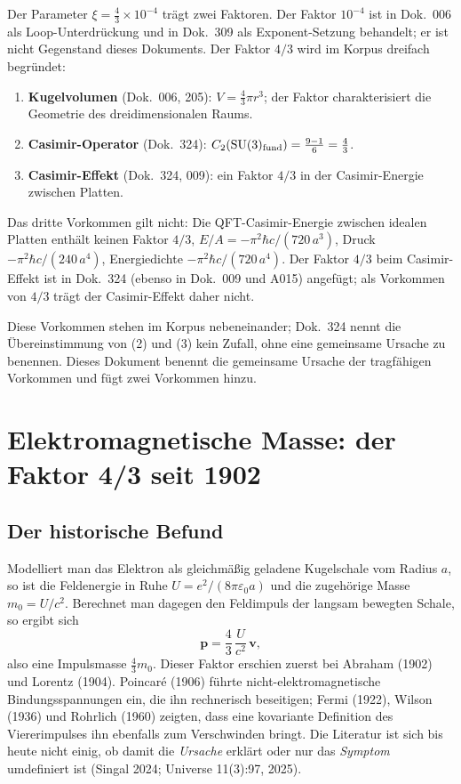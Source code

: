 Der Parameter $\xi = \tfrac{4}{3}\times10^{-4}$ trägt zwei Faktoren. Der
Faktor $10^{-4}$ ist in Dok.~006 als Loop-Unterdrückung und in Dok.~309 als
Exponent-Setzung behandelt; er ist nicht Gegenstand dieses Dokuments. Der
Faktor $4/3$ wird im Korpus dreifach begründet:

\begin{enumerate}
\item \textbf{Kugelvolumen} (Dok.~006, 205): $V = \tfrac{4}{3}\pi r^3$; der
  Faktor charakterisiert die Geometrie des dreidimensionalen Raums.
\item \textbf{Casimir-Operator} (Dok.~324): $C_2(\mathrm{SU}(3)_{\rm fund})
  = \tfrac{9-1}{6} = \tfrac{4}{3}$.
\item \textbf{Casimir-Effekt} (Dok.~324, 009): ein Faktor $4/3$ in
  der Casimir-Energie zwischen Platten.
\end{enumerate}
Das dritte Vorkommen gilt nicht: Die QFT-Casimir-Energie zwischen idealen
Platten enthält keinen Faktor $4/3$, $E/A = -\pi^2\hbar c/(720\,a^3)$, Druck
$-\pi^2\hbar c/(240\,a^4)$, Energiedichte $-\pi^2\hbar c/(720\,a^4)$. Der
Faktor $4/3$ beim Casimir-Effekt ist in Dok.~324 (ebenso in Dok.~009 und A015)
angefügt; als Vorkommen von $4/3$ trägt der Casimir-Effekt daher nicht.

Diese Vorkommen stehen im Korpus nebeneinander; Dok.~324 nennt die
Übereinstimmung von (2) und (3) \glqq kein Zufall\grqq, ohne eine gemeinsame
Ursache zu benennen. Dieses Dokument benennt die gemeinsame Ursache der
tragfähigen Vorkommen und fügt zwei Vorkommen hinzu.

\section{Elektromagnetische Masse: der Faktor 4/3 seit 1902}
\label{sec:em}

\subsection{Der historische Befund \EM}

Modelliert man das Elektron als gleichmäßig geladene Kugelschale vom Radius
$a$, so ist die Feldenergie in Ruhe $U = e^2/(8\pi\varepsilon_0 a)$ und die
zugehörige Masse $m_0 = U/c^2$. Berechnet man dagegen den Feldimpuls der
langsam bewegten Schale, so ergibt sich
\begin{equation}
  \mathbf p = \frac{4}{3}\,\frac{U}{c^2}\,\mathbf v ,
  \label{eq:p43}
\end{equation}
also eine Impulsmasse $\tfrac{4}{3}m_0$. Dieser Faktor erschien zuerst bei
Abraham (1902) und Lorentz (1904). Poincaré (1906) führte nicht-elektromagnetische
Bindungsspannungen ein, die ihn rechnerisch beseitigen; Fermi (1922), Wilson
(1936) und Rohrlich (1960) zeigten, dass eine kovariante Definition des
Viererimpulses ihn ebenfalls zum Verschwinden bringt. Die Literatur ist sich bis
heute nicht einig, ob damit die \emph{Ursache} erklärt oder nur das
\emph{Symptom} umdefiniert ist (Singal 2024; Universe 11(3):97, 2025).


